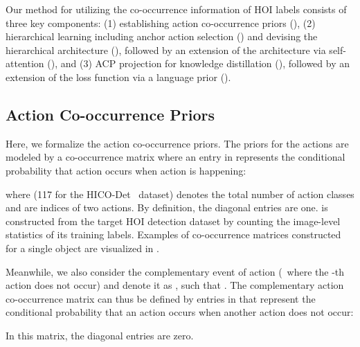 

{Our method for utilizing the co-occurrence information of HOI labels consists of three key components:} 
(1) establishing action co-occurrence priors (), (2) hierarchical learning including anchor action selection () and devising the hierarchical architecture (), followed by an extension of the architecture via self-attention (), and 
(3) {ACP projection for knowledge distillation} (), followed by an extension of the loss function via a language prior ().







\subsection{Action Co-occurrence Priors}
\label{sec.prior}











{Here, we formalize the action co-occurrence priors.} 
The priors for the actions are modeled by a co-occurrence matrix  where an entry  in  represents the conditional probability that action  occurs when action  is happening: 

where  
(117 for the HICO-Det~\cite{chao2018learning} dataset) 
denotes the total number of action classes and  are indices of two actions. 
By definition, the diagonal entries are one.
 is constructed from the target HOI detection dataset by counting the {image-level} statistics of its training labels.
Examples of co-occurrence matrices constructed for a single object are visualized in .




Meanwhile, we also consider the complementary event of action  (\ie~where the -th action does not occur) and denote it as , such that .
The complementary action co-occurrence matrix  can thus be defined by entries  in  that represent the conditional probability that an action  occurs when another action  does not occur: 

In this matrix, the diagonal entries are zero.



